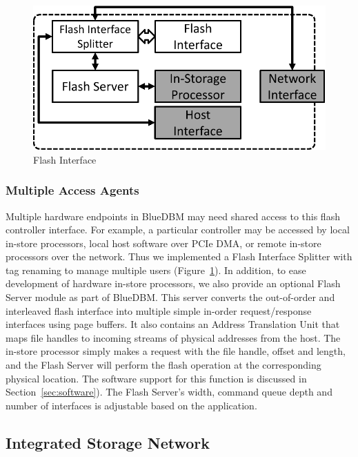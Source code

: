 \begin{figure}[h]
	\begin{center}
	\includegraphics[scale=0.4]{figures/architecture_flash-crop.pdf}
	\caption{Flash Interface}
	\label{fig:flashinterface}
	\end{center}
\end{figure}

\subsubsection{Multiple Access Agents}

Multiple hardware endpoints in BlueDBM may need shared access to this
flash controller interface. For example, a particular controller may
be accessed by local in-store processors, local host software over PCIe
DMA, or remote in-store processors over the network. Thus we implemented a
Flash Interface Splitter with tag renaming to manage multiple users
(Figure~\ref{fig:flashinterface}). In addition, 
to ease development of hardware in-store processors,
we also provide an optional Flash Server module as part of BlueDBM. This server
converts the out-of-order and interleaved flash interface into
multiple simple in-order request/response interfaces
using page buffers. It also contains an Address Translation Unit that 
maps file handles to incoming streams of physical addresses from the host. The in-store processor
simply makes a request with the file handle, offset and length, and the Flash Server will perform
the flash operation at the corresponding physical location. The software
support for this function is discussed in Section~\ref{sec:software}). The Flash
Server's width, command queue depth and number of interfaces is adjustable 
based on the application.

\subsection{Integrated Storage Network}


